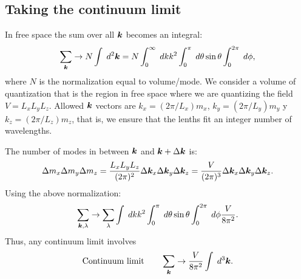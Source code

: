 \subsection{Taking the continuum limit}
In free space the sum over all $\bm{k}$ becomes an integral:
\begin{align*}
    \sum_{\bm{k}}\to N\int\;d^2\bm{k}=N\int_0^\infty\;dkk^2\int_0^\pi\;d\theta\sin\theta\int_0^{2\pi}\;d\phi,
\end{align*}
where $N$ is the normalization equal to volume/mode.
We consider a volume of quantization that is the region in free space where we are quantizing the field $V=L_xL_yL_z$.
Allowed $\bm{k}$ vectors are $k_x=(2\pi/L_x)m_x$, $k_y=(2\pi/L_y)m_y$ y $k_z=(2\pi/L_z)m_z$, that is, we ensure that the lenths fit an integer number of 
wavelengths. 

The number of modes in between $\bm{k}$ and $\bm{k}+\Delta\bm{k}$ is:
\begin{align*}
    \Delta m_x\Delta m_y\Delta m_z=\frac{L_xL_yL_z}{(2\pi)^2}\Delta\bm{k}_x\Delta\bm{k}_y\Delta\bm{k}_z=\frac{V}{(2\pi)^3}\Delta\bm{k}_x\Delta\bm{k}_y\Delta\bm{k}_z.
\end{align*}
Using the above normalization:
\begin{align*}
    \sum_{\bm{k},\lambda}\to\sum_\lambda\int\;dkk^2\int_0^\pi\;d\theta\sin\theta\int_0^{2\pi}\;d\phi\frac{V}{8\pi^2}.
\end{align*}
Thus, any continuum limit involves
\begin{align*}
    \text{Continuum limit}\qquad\sum_{\bm{k}}\to\frac{V}{8\pi^2}\int\;d^3\bm{k}.
\end{align*}